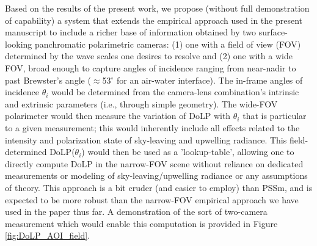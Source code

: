\documentclass[letterpaper,journal]{IEEEtran}
\begin{document}
Based on the results of the present work, we propose (without full demonstration of capability) a system that extends the empirical approach used in the present manuscript to include a richer base of information obtained by two surface-looking panchromatic polarimetric cameras: (1) one with a field of view (FOV) determined by the wave scales one desires to resolve and (2) one with a wide FOV, broad enough to capture angles of incidence ranging from near-nadir to past Brewster's angle ($\approx$53$^{\circ}$ for an air-water interface). The in-frame angles of incidence $\theta_i$ would be determined from the camera-lens combination's intrinsic and extrinsic parameters (i.e., through simple geometry). The wide-FOV polarimeter would then measure the variation of DoLP with $\theta_i$ that is particular to a given measurement; this would inherently include all effects related to the intensity and polarization state of sky-leaving and upwelling radiance. This field-determined DoLP($\theta_i$) would then be used as a 'lookup-table', allowing one to directly compute DoLP in the narrow-FOV scene without reliance on dedicated measurements or modeling of sky-leaving/upwelling radiance \cite{foster_characterization_2015,foster_polarized_2016} or any assumptions of theory. This approach is a bit cruder (and easier to employ) than PSSm, and is expected to be more robust than the narrow-FOV empirical approach we have used in the paper thus far. A demonstration of the sort of two-camera measurement which would enable this computation is provided in Figure \ref{fig:DoLP_AOI_field}.

\end{document}
